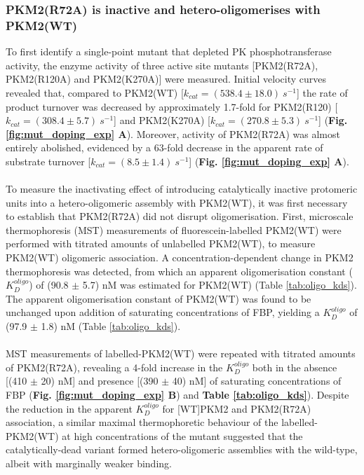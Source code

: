 \subsubsection{PKM2(R72A) is inactive and hetero-oligomerises with PKM2(WT)}
To first identify a single-point mutant that depleted PK phosphotransferase activity, the enzyme activity of three active site mutants [PKM2(R72A), PKM2(R120A) and PKM2(K270A)] were measured. Initial velocity curves revealed that, compared to PKM2(WT) [$k_{cat} = (538.4 \pm 18.0) \: s^{-1}$] the rate of product turnover was decreased by approximately 1.7-fold for PKM2(R120) [$k_{cat} = (308.4 \pm 5.7) \: s^{-1}$] and PKM2(K270A) [$k_{cat} = (270.8 \pm 5.3) \: s^{-1}$] (\textbf{Fig. \ref{fig:mut_doping_exp} A}). Moreover, activity of PKM2(R72A) was almost entirely abolished, evidenced by a 63-fold decrease in the apparent rate of substrate turnover [$k_{cat} = (8.5 \pm 1.4) \: s^{-1}$] (\textbf{Fig. \ref{fig:mut_doping_exp} A}). 
%
%
\\\\
%
%
To measure the inactivating effect of introducing catalytically inactive protomeric units into a hetero-oligomeric assembly with PKM2(WT), it was first necessary to establish that PKM2(R72A) did not disrupt oligomerisation. First, microscale thermophoresis (MST) measurements of fluorescein-labelled PKM2(WT) were performed with titrated amounts of unlabelled PKM2(WT), to measure PKM2(WT) oligomeric association. A concentration-dependent change in PKM2 thermophoresis was detected, from which an apparent oligomerisation constant ($K_{D}^{oligo}$) of (90.8 $\pm$ 5.7) nM was estimated for PKM2(WT) (Table \ref{tab:oligo_kds}). The apparent oligomerisation constant of PKM2(WT) was found to be unchanged upon addition of saturating concentrations of FBP, yielding a $K_{D}^{oligo}$ of (97.9 $\pm$ 1.8) nM (Table \ref{tab:oligo_kds}).
%
%
\\\\
%
%
MST measurements of labelled-PKM2(WT) were repeated with titrated amounts of PKM2(R72A), revealing a 4-fold increase in the $K_{D}^{oligo}$ both in the absence [(410 $\pm$ 20) nM] and presence [(390 $\pm$ 40) nM] of saturating concentrations of FBP (\textbf{Fig. \ref{fig:mut_doping_exp} B}) and \textbf{Table \ref{tab:oligo_kds}}). Despite the reduction in the apparent $K_{D}^{oligo}$ for [WT]PKM2 and PKM2(R72A) association, a similar maximal thermophoretic behaviour of the labelled-PKM2(WT) at high concentrations of the mutant suggested that the catalytically-dead variant formed hetero-oligomeric assemblies with the wild-type, albeit with marginally weaker binding. 
